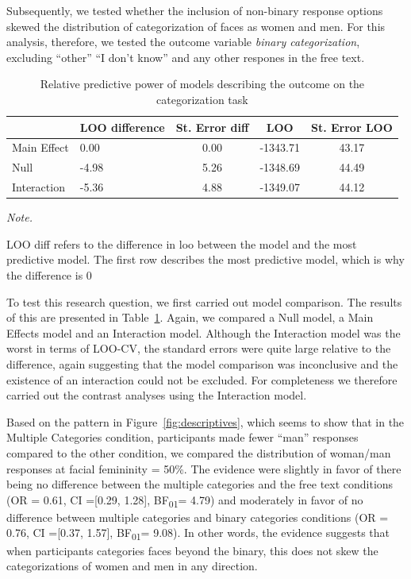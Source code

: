 \documentclass[
  man]{apa7}
\begin{document}
Subsequently, we tested whether the inclusion of non-binary response options skewed the distribution of categorization of faces as women and men. For this analysis, therefore, we tested the outcome variable \emph{binary categorization}, excluding ``other'' ``I don't know'' and any other respones in the free text.

\begin{table}

\caption{\label{tab:rq2-table}Relative predictive power of models describing the outcome on the categorization task}
\centering
\begin{threeparttable}
\begin{tabular}[t]{llccc}
\toprule
  & LOO difference & St. Error diff & LOO & St. Error LOO\\
\midrule
Main Effect & 0.00 & 0.00 & -1343.71 & 43.17\\
Null & -4.98 & 5.26 & -1348.69 & 44.49\\
Interaction & -5.36 & 4.88 & -1349.07 & 44.12\\
\bottomrule
\end{tabular}
\begin{tablenotes}[para]
\item \textit{Note.} 
\item LOO diff refers to the difference in loo between the model and the most predictive model. The first row describes the most predictive model, which is why the difference is 0
\end{tablenotes}
\end{threeparttable}
\end{table}

To test this research question, we first carried out model comparison. The results of this are presented in Table~\ref{tab:rq2-table}. Again, we compared a Null model, a Main Effects model and an Interaction model. Although the Interaction model was the worst in terms of LOO-CV, the standard errors were quite large relative to the difference, again suggesting that the model comparison was inconclusive and the existence of an interaction could not be excluded. For completeness we therefore carried out the contrast analyses using the Interaction model.

Based on the pattern in Figure~\ref{fig:descriptives}, which seems to show that in the Multiple Categories condition, participants made fewer ``man'' responses compared to the other condition, we compared the distribution of woman/man responses at facial femininity = 50\%. The evidence were slightly in favor of there being no difference between the multiple categories and the free text conditions (OR = 0.61, CI ={[}0.29, 1.28{]}, BF\textsubscript{01}= 4.79) and moderately in favor of no difference between multiple categories and binary categories conditions (OR = 0.76, CI ={[}0.37, 1.57{]}, BF\textsubscript{01}= 9.08). In other words, the evidence suggests that when participants categories faces beyond the binary, this does not skew the categorizations of women and men in any direction.
\end{document}

